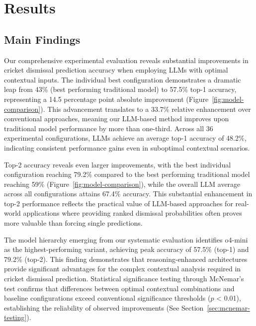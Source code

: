 \documentclass[sigconf,anonymous,review]{acmart}
\begin{document}
\section{Results}

\subsection{Main Findings}
Our comprehensive experimental evaluation reveals substantial improvements in cricket dismissal prediction accuracy when employing LLMs with optimal contextual inputs. The individual best configuration demonstrates a dramatic leap from 43\% (best performing traditional model) to 57.5\% top-1 accuracy, representing a 14.5 percentage point absolute improvement (Figure~\ref{fig:model-comparison}). This advancement translates to a 33.7\% relative enhancement over conventional approaches, meaning our LLM-based method improves upon traditional model performance by more than one-third. Across all 36 experimental configurations, LLMs achieve an average top-1 accuracy of 48.2\%, indicating consistent performance gains even in suboptimal contextual scenarios.

Top-2 accuracy reveals even larger improvements, with the best individual configuration reaching 79.2\% compared to the best performing traditional model reaching 59\% (Figure~\ref{fig:model-comparison}), while the overall LLM average across all configurations attains 67.4\% accuracy. This substantial enhancement in top-2 performance reflects the practical value of LLM-based approaches for real-world applications where providing ranked dismissal probabilities often proves more valuable than forcing single predictions.

The model hierarchy emerging from our systematic evaluation identifies o4-mini as the highest-performing variant, achieving peak accuracy of 57.5\% (top-1) and 79.2\% (top-2). This finding demonstrates that reasoning-enhanced architectures provide significant advantages for the complex contextual analysis required in cricket dismissal prediction. Statistical significance testing through McNemar's test confirms that differences between optimal contextual combinations and baseline configurations exceed conventional significance thresholds ($p$ < 0.01), establishing the reliability of observed improvements (See Section~\ref{sec:mcnemar-testing}).
\end{document}
